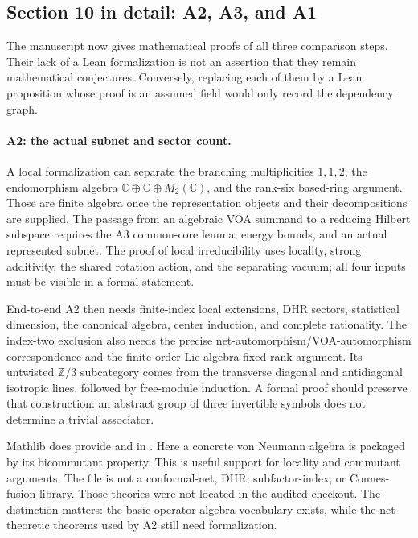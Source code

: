 \subsection{Section 10 in detail: A2, A3, and A1}

The manuscript now gives mathematical proofs of all three comparison
steps. Their lack of a Lean formalization is not an assertion that they
remain mathematical conjectures. Conversely, replacing each of them
by a Lean proposition whose proof is an assumed field would only record
the dependency graph.

\paragraph{A2: the actual subnet and sector count.}
A local formalization can separate the branching multiplicities
$1,1,2$, the endomorphism algebra
$\mathbb C\oplus\mathbb C\oplus M_2(\mathbb C)$, and the rank-six
based-ring argument. Those are finite algebra once the representation
objects and their decompositions are supplied. The passage from an
algebraic VOA summand to a reducing Hilbert subspace requires the A3
common-core lemma, energy bounds, and an actual represented subnet.
The proof of local irreducibility uses locality, strong additivity,
the shared rotation action, and the separating vacuum; all four inputs
must be visible in a formal statement.

End-to-end A2 then needs finite-index local extensions, DHR sectors,
statistical dimension, the canonical algebra, center induction, and
complete rationality. The index-two exclusion also needs the precise
net-automorphism/VOA-automorphism correspondence and the finite-order
Lie-algebra fixed-rank argument. Its untwisted $\mathbb Z/3$ subcategory
comes from the transverse diagonal and antidiagonal isotropic lines,
followed by free-module induction. A formal proof should preserve that
construction: an abstract group of three invertible symbols does not
determine a trivial associator.

Mathlib does provide  and
 in
.
Here a concrete von Neumann algebra is packaged by its bicommutant
property. This is useful support for locality and commutant arguments.
The file is not a conformal-net, DHR, subfactor-index, or Connes-fusion
library. Those theories were not located in the audited checkout.
The distinction matters: the basic operator-algebra vocabulary exists,
while the net-theoretic theorems used by A2 still need formalization.


